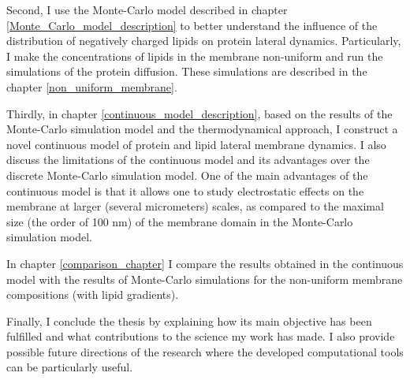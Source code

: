 Second, I use the Monte-Carlo model described in chapter \ref{Monte_Carlo_model_description} to better understand the influence of the distribution of negatively charged lipids on protein lateral dynamics. Particularly, I make the concentrations of lipids in the membrane non-uniform and run the simulations of the protein diffusion. These simulations are described in the chapter \ref{non_uniform_membrane}.

Thirdly, in chapter \ref{continuous_model_description}, based on the results of the Monte-Carlo simulation model and the thermodynamical approach, I construct a novel continuous model of protein and lipid lateral membrane dynamics. I also discuss the limitations of the continuous model and its advantages  over the discrete Monte-Carlo simulation model. One of the main advantages of the continuous model is that it allows one to study electrostatic effects on the membrane at larger (several micrometers) scales, as compared to the maximal size (the order of 100 nm) of the membrane domain in the Monte-Carlo simulation model.

In chapter \ref{comparison_chapter} I compare the results obtained in the continuous model with the results of Monte-Carlo simulations for the non-uniform membrane compositions (with lipid gradients).

Finally, I conclude the thesis by explaining how its main objective has been fulfilled and what contributions to the science my work has made. I also provide possible future directions of the research where the developed computational tools can be particularly useful.